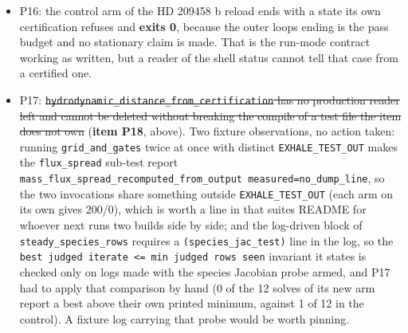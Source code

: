 \documentclass[english,a4paper]{my_memo}
\begin{document}
\begin{itemize}
  header calls a measured number and not an estimate, reaches no run summary;
  relatedly, nothing in \texttt{run.log} says whether \texttt{EXHALE\_RESID\_QUAD} took
  effect, so P15 had to establish that its arm run was an arm run indirectly,
  from the iteration-1 measure moving between the two binaries and from the
  sweep-kind reset READ in \texttt{steady\_newton.f90}. A line in the setup report, or
  those two counters reaching it, would make an arm run self-documenting. And
  the continuation refusal the item added has no executed row: it ends in
  \texttt{error\ stop}, which cannot be asserted from inside the driver process, and
  no production path reaches it, the key being default off and the
  continuation controller disarming before the JFNK finish (READ).
\item
  P16: the control arm of the HD 209458 b reload ends with a state its own
  certification refuses and \textbf{exits 0}, because the outer loop\textquotesingle s ending is
  the pass budget and no stationary claim is made. That is the run-mode
  contract working as written, but a reader of the shell status cannot tell
  that case from a certified one.
\item
  P17: \st{\mbox{\texttt{hydrodynamic\_distance\_from\_certification}} has no production reader
  left and cannot be deleted without breaking the compile of a test file the
  item does not own} (\textbf{item P18}, above). Two fixture observations, no
  action taken: running \texttt{grid\_and\_gates} twice at once with distinct
  \texttt{EXHALE\_TEST\_OUT} makes the \texttt{flux\_spread} sub-test report
  \texttt{mass\_flux\_spread\_recomputed\_from\_output\ measured=no\_dump\_line}, so the two
  invocations share something outside \texttt{EXHALE\_TEST\_OUT} (each arm on its own
  gives 200/0), which is worth a line in that suite\textquotesingle s README for whoever next
  runs two builds side by side; and the log-driven block of
  \texttt{steady\_species\_rows} requires a \texttt{(species\_jac\_test)} line in the log, so
  the \texttt{best\ judged\ iterate\ \textless{}=\ min\ judged\ rows\ seen} invariant it states is
  checked only on logs made with the species Jacobian probe armed, and P17 had
  to apply that comparison by hand (0 of the 12 solves of its new arm report a
  best above their own printed minimum, against 1 of 12 in the control). A
  fixture log carrying that probe would be worth pinning.
\end{itemize}

\appendix

\end{document}
